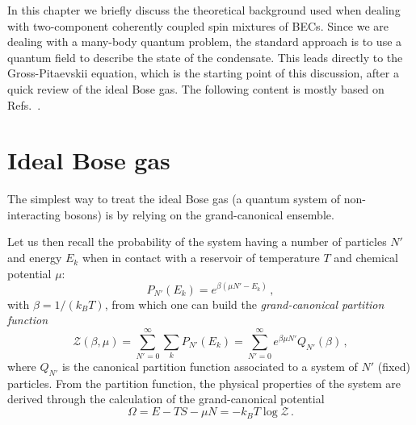 In this chapter we briefly discuss the theoretical background used when dealing with two-component coherently coupled spin mixtures of BECs. Since we are dealing with a many-body quantum problem, the standard approach is to use a quantum field to describe the state of the condensate. This leads directly to the Gross-Pitaevskii equation, which is the starting point of this discussion, after a quick review of the ideal Bose gas. The following content is mostly based on Refs.\ \cite{pitaevskii2016bose, lamporesi2023two}.

\section{Ideal Bose gas}
The simplest way to treat the ideal Bose gas (a quantum system of non-interacting bosons) is by relying on the grand-canonical ensemble. 

Let us then recall the probability of the system having a number of particles $N'$ and energy $E_k$ when in contact with a reservoir of temperature $T$ and chemical potential $\mu$:
\begin{equation*}
    P_{N'}(E_k) = e^{\beta(\mu N' - E_k)}\, ,
\end{equation*}
with $\beta = 1/(k_B T)$, from which one can build the \textit{grand-canonical partition function}
\begin{equation}
    \mathcal{Z}(\beta, \mu) = \sum_{N' = 0}^\infty \sum_k P_{N'}(E_k) = \sum_{N' = 0}^\infty e^{\beta \mu N'} Q_{N'}(\beta)\, ,
    \label{eq:part_func}
\end{equation}
where $Q_{N'}$ is the canonical partition function associated to a system of $N'$ (fixed) particles. From the partition function, the physical properties of the system are derived through the calculation of the grand-canonical potential 
\begin{equation}
    \Omega = E - T S - \mu N = -k_B T \log\mathcal{Z}\, .
    \label{eq:GC_potential}
\end{equation}

